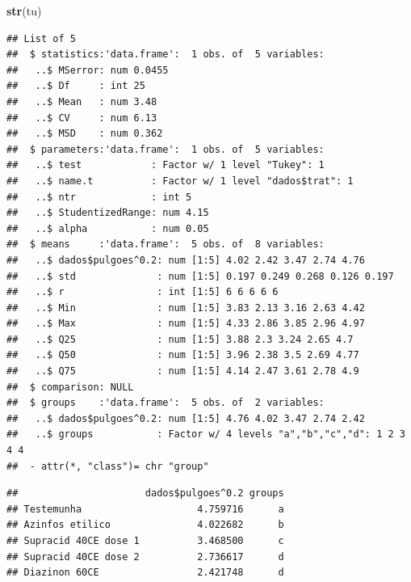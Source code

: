 \documentclass[
]{book}
\newenvironment{Shaded}{\begin{snugshade}}{\end{snugshade}}
\newcommand{\CharTok}[1]{\textcolor[rgb]{0.31,0.60,0.02}{#1}}
\newcommand{\DataTypeTok}[1]{\textcolor[rgb]{0.13,0.29,0.53}{#1}}
\newcommand{\KeywordTok}[1]{\textcolor[rgb]{0.13,0.29,0.53}{\textbf{#1}}}
\newcommand{\NormalTok}[1]{#1}
\newcommand{\OperatorTok}[1]{\textcolor[rgb]{0.81,0.36,0.00}{\textbf{#1}}}
\newcommand{\StringTok}[1]{\textcolor[rgb]{0.31,0.60,0.02}{#1}}
\begin{document}
\begin{Shaded}
\begin{Highlighting}[]
\KeywordTok{str}\NormalTok{(tu)}
\end{Highlighting}
\end{Shaded}

\begin{verbatim}
## List of 5
##  $ statistics:'data.frame':  1 obs. of  5 variables:
##   ..$ MSerror: num 0.0455
##   ..$ Df     : int 25
##   ..$ Mean   : num 3.48
##   ..$ CV     : num 6.13
##   ..$ MSD    : num 0.362
##  $ parameters:'data.frame':  1 obs. of  5 variables:
##   ..$ test            : Factor w/ 1 level "Tukey": 1
##   ..$ name.t          : Factor w/ 1 level "dados$trat": 1
##   ..$ ntr             : int 5
##   ..$ StudentizedRange: num 4.15
##   ..$ alpha           : num 0.05
##  $ means     :'data.frame':  5 obs. of  8 variables:
##   ..$ dados$pulgoes^0.2: num [1:5] 4.02 2.42 3.47 2.74 4.76
##   ..$ std              : num [1:5] 0.197 0.249 0.268 0.126 0.197
##   ..$ r                : int [1:5] 6 6 6 6 6
##   ..$ Min              : num [1:5] 3.83 2.13 3.16 2.63 4.42
##   ..$ Max              : num [1:5] 4.33 2.86 3.85 2.96 4.97
##   ..$ Q25              : num [1:5] 3.88 2.3 3.24 2.65 4.7
##   ..$ Q50              : num [1:5] 3.96 2.38 3.5 2.69 4.77
##   ..$ Q75              : num [1:5] 4.14 2.47 3.61 2.78 4.9
##  $ comparison: NULL
##  $ groups    :'data.frame':  5 obs. of  2 variables:
##   ..$ dados$pulgoes^0.2: num [1:5] 4.76 4.02 3.47 2.74 2.42
##   ..$ groups           : Factor w/ 4 levels "a","b","c","d": 1 2 3 4 4
##  - attr(*, "class")= chr "group"
\end{verbatim}

\begin{Shaded}
\end{Shaded}

\begin{verbatim}
##                      dados$pulgoes^0.2 groups
## Testemunha                    4.759716      a
## Azinfos etilico               4.022682      b
## Supracid 40CE dose 1          3.468500      c
## Supracid 40CE dose 2          2.736617      d
## Diazinon 60CE                 2.421748      d
\end{verbatim}

\begin{Shaded}
\end{Shaded}
\end{document}
